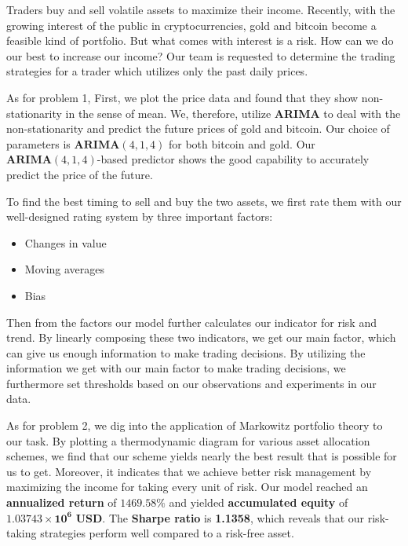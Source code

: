 \documentclass[12pt,a4paper]{article}
\newcommand{\Predictor}{ARIMA }
\begin{document}
\begin{spacing}{1.2}   %



Traders buy and sell volatile assets to maximize their income. Recently, with the growing interest of the public in cryptocurrencies, gold and bitcoin become a feasible kind of portfolio. But what comes with interest is a risk. How can we do our best to increase our income? Our team is requested to determine the trading strategies for a trader which utilizes only the past daily prices. 

As for problem 1, First, we plot the price data and found that they show non-stationarity in the sense of mean. We, therefore, utilize \textbf{\Predictor} to deal with the non-stationarity and predict the future prices of gold and bitcoin. Our choice of parameters is $\mathbf{ARIMA}(4,1,4)$ for both bitcoin and gold. Our $\mathbf{ARIMA}(4,1,4)$-based predictor shows the good capability to accurately predict the price of the future.

To find the best timing to sell and buy the two assets, we first rate them with our well-designed rating system by three important factors:

\begin{itemize}
	\item Changes in value
	\item Moving averages
	\item Bias
\end{itemize}
 

Then from the factors our model further calculates our indicator for risk and trend. By linearly composing these two indicators, we get our main factor, which can give us enough information to make trading decisions. By utilizing the information we get with our main factor to make trading decisions, we furthermore set thresholds based on our observations and experiments in our data. 

As for problem 2, we dig into the application of Markowitz portfolio theory to our task. By plotting a thermodynamic diagram for various asset allocation schemes, we find that our scheme yields nearly the best result that is possible for us to get. Moreover, it indicates that we achieve better risk management by maximizing the income for taking every unit of risk.
Our model reached an \textbf{annualized return} of $\mathbf{1469.58\%}$ and yielded \textbf{accumulated equity} of $\mathbf{1.03743 \times 10^6}$ \textbf{USD}. The \textbf{Sharpe ratio} is \textbf{1.1358}, which reveals that our risk-taking strategies perform well compared to a risk-free asset.


\end{spacing}
\end{document}
